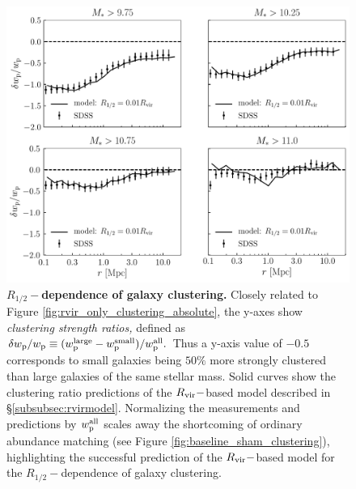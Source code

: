 \documentclass[usenatbib,usegraphicx,letterpaper]{mn2e}
\newcommand{\rhalf}{R_{1/2}}
\newcommand{\rvir}{R_{\rm vir}}
\newcommand{\wproj}{w_{\rm p}}
\begin{document}
\begin{figure}
\centering
\includegraphics[width=12cm]{FIGS/rvir_only_wp_ratios.pdf}
\caption{
{\bf $\rhalf-$dependence of galaxy clustering.}
Closely related to Figure \ref{fig:rvir_only_clustering_absolute}, the y-axes show {\em clustering strength ratios,} defined as $\delta\wproj/\wproj\equiv(w_{\rm p}^{\rm large} - w_{\rm p}^{\rm small})/w_{\rm p}^{\rm all}.$ Thus a y-axis value of $-0.5$ corresponds to small galaxies being $50\%$ more strongly clustered than large galaxies of the same stellar mass. Solid curves show the clustering ratio predictions of the $\rvir-$based model described in \S\ref{subsubsec:rvirmodel}. Normalizing the measurements and predictions by $w_{\rm p}^{\rm all}$ scales away the shortcoming of ordinary abundance matching (see Figure \ref{fig:baseline_sham_clustering}), highlighting the successful prediction of the $\rvir-$based model for the $\rhalf-$dependence of galaxy clustering.
}
\label{fig:clustering_ratio_upshot}
\end{figure}
\end{document}
